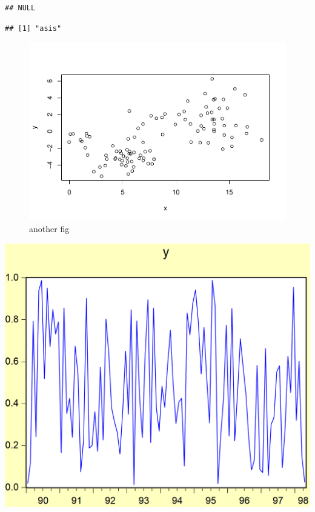 \documentclass[
]{article}
\begin{document}
\begin{verbatim}
## NULL
\end{verbatim}

\begin{verbatim}
## [1] "asis"
\end{verbatim}

\begin{figure}[h]

{\centering \includegraphics[width=\textwidth]{test_engEviews_files/figure-latex/labe-1} 

}

\caption{another fig}\label{fig:labe}
\end{figure}

\begin{center}\includegraphics[width=\textwidth]{test_engEviews_files/figure-latex//eview-graph-y} \end{center}
\end{document}
